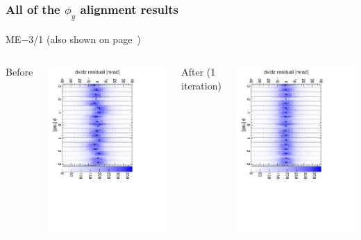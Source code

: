 \documentclass[compress]{beamer}
\begin{document}
\begin{frame}
\frametitle{All of the $\phi_y$ alignment results}
\begin{center}
ME$-$3/1 (also shown on page~\pageref{mem31phiy})
\end{center}

\begin{columns}
\centering Before

\includegraphics[height=\linewidth, angle=90]{iter01_mem31.pdf}

\centering After (1 iteration)

\includegraphics[height=\linewidth, angle=90]{iter02_mem31.pdf}
\end{columns}


\end{frame}
\end{document}
